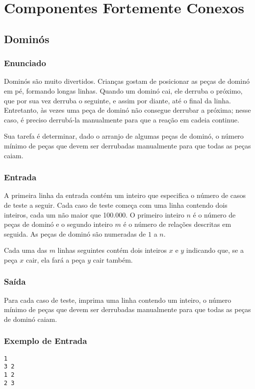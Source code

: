 \section{Componentes Fortemente Conexos}
\subsection{Dominós}

\subsubsection*{Enunciado}
Dominós são muito divertidos. Crianças gostam de posicionar as peças de dominó em pé, formando longas linhas. Quando um dominó cai, ele derruba o próximo, que por sua vez derruba o seguinte, e assim por diante, até o final da linha. Entretanto, às vezes uma peça de dominó não consegue derrubar a próxima; nesse caso, é preciso derrubá-la manualmente para que a reação em cadeia continue.

Sua tarefa é determinar, dado o arranjo de algumas peças de dominó, o número mínimo de peças que devem ser derrubadas manualmente para que todas as peças caiam.

\subsubsection*{Entrada}
A primeira linha da entrada contém um inteiro que especifica o número de casos de teste a seguir.  
Cada caso de teste começa com uma linha contendo dois inteiros, cada um não maior que 100.000. O primeiro inteiro \(n\) é o número de peças de dominó e o segundo inteiro \(m\) é o número de relações descritas em seguida. As peças de dominó são numeradas de \(1\) a \(n\).

Cada uma das \(m\) linhas seguintes contém dois inteiros \(x\) e \(y\) indicando que, se a peça \(x\) cair, ela fará a peça \(y\) cair também.

\subsubsection*{Saída}
Para cada caso de teste, imprima uma linha contendo um inteiro, o número mínimo de peças que devem ser derrubadas manualmente para que todas as peças de dominó caiam.

\subsubsection*{Exemplo de Entrada}
\begin{verbatim}
1
3 2
1 2
2 3
\end{verbatim}

